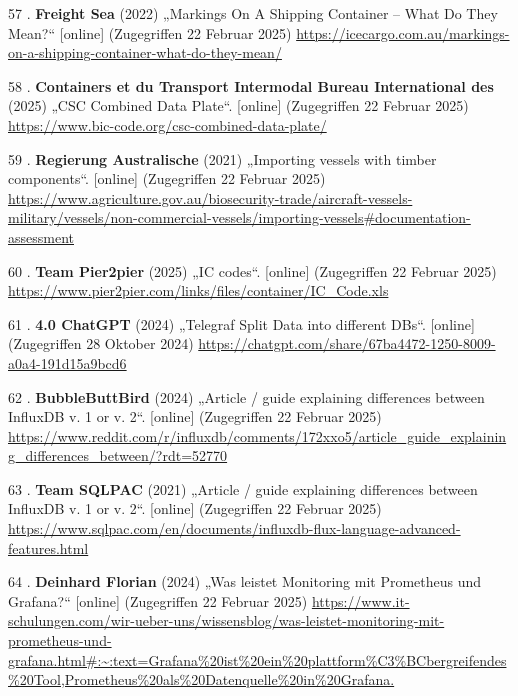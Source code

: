 \documentclass[
    headings=optiontotocandhead,%
    twoside,
    numbers=noenddot,%
    12pt, %
    titlepage, %
    parskip=full, %
    listof=leveldown, 
    numbers=noenddot, %
    a4paper,DIV=14,
    BCOR=15mm,
]{scrbook}
\newlength{\cslhangindent}
\newenvironment{cslreferences}%
  {\setlength{\parindent}{0pt}%
  \everypar{\setlength{\hangindent}{\cslhangindent}}\ignorespaces}%
  {\par}
\begin{document}
\begin{cslreferences}
\leavevmode\hypertarget{ref-icecargo}{}%
57 . \textbf{Freight Sea} (2022) „Markings On A Shipping Container --
What Do They Mean?{}`` {[}online{]} (Zugegriffen 22 Februar 2025)
\url{https://icecargo.com.au/markings-on-a-shipping-container-what-do-they-mean/}

\leavevmode\hypertarget{ref-bic-code-csc}{}%
58 . \textbf{Containers et du Transport Intermodal Bureau International
des} (2025) „CSC Combined Data Plate``. {[}online{]} (Zugegriffen 22
Februar 2025) \url{https://www.bic-code.org/csc-combined-data-plate/}

\leavevmode\hypertarget{ref-tct}{}%
59 . \textbf{Regierung Australische} (2021) „Importing vessels with
timber components``. {[}online{]} (Zugegriffen 22 Februar 2025)
\url{https://www.agriculture.gov.au/biosecurity-trade/aircraft-vessels-military/vessels/non-commercial-vessels/importing-vessels\#documentation-assessment}

\leavevmode\hypertarget{ref-ic-codes}{}%
60 . \textbf{Team Pier2pier} (2025) „IC codes``. {[}online{]}
(Zugegriffen 22 Februar 2025)
\url{https://www.pier2pier.com/links/files/container/IC_Code.xls}

\leavevmode\hypertarget{ref-gpt-telegraf-regex}{}%
61 . \textbf{4.0 ChatGPT} (2024) „Telegraf Split Data into different
DBs``. {[}online{]} (Zugegriffen 28 Oktober 2024)
\url{https://chatgpt.com/share/67ba4472-1250-8009-a0a4-191d15a9bcd6}

\leavevmode\hypertarget{ref-influx-v1-vs-v2}{}%
62 . \textbf{BubbleButtBird} (2024) „Article / guide explaining
differences between InfluxDB v. 1 or v. 2``. {[}online{]} (Zugegriffen
22 Februar 2025)
\url{https://www.reddit.com/r/influxdb/comments/172xxo5/article_guide_explaining_differences_between/?rdt=52770}

\leavevmode\hypertarget{ref-flux}{}%
63 . \textbf{Team SQLPAC} (2021) „Article / guide explaining differences
between InfluxDB v. 1 or v. 2``. {[}online{]} (Zugegriffen 22 Februar
2025)
\url{https://www.sqlpac.com/en/documents/influxdb-flux-language-advanced-features.html}

\leavevmode\hypertarget{ref-grafana-general}{}%
64 . \textbf{Deinhard Florian} (2024) „Was leistet Monitoring mit
Prometheus und Grafana?{}`` {[}online{]} (Zugegriffen 22 Februar 2025)
\url{https://www.it-schulungen.com/wir-ueber-uns/wissensblog/was-leistet-monitoring-mit-prometheus-und-grafana.html\#:~:text=Grafana\%20ist\%20ein\%20plattform\%C3\%BCbergreifendes\%20Tool,Prometheus\%20als\%20Datenquelle\%20in\%20Grafana.}


\end{cslreferences}
\end{document}
